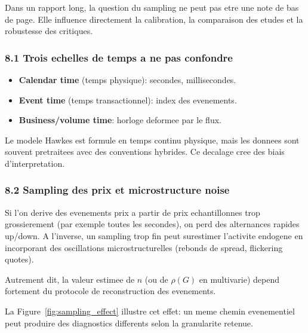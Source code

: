 \documentclass[11pt,a4paper]{article}
\begin{document}
Dans un rapport long, la question du sampling ne peut pas etre une note de bas de page. Elle influence directement la calibration, la comparaison des etudes et la robustesse des critiques.

\subsubsection*{8.1 Trois echelles de temps a ne pas confondre}
\begin{itemize}[leftmargin=1.2cm]
    \item \textbf{Calendar time} (temps physique): secondes, millisecondes.
    \item \textbf{Event time} (temps transactionnel): index des evenements.
    \item \textbf{Business/volume time}: horloge deformee par le flux.
\end{itemize}

Le modele Hawkes est formule en temps continu physique, mais les donnees sont souvent pretraitees avec des conventions hybrides. Ce decalage cree des biais d'interpretation.

\subsubsection*{8.2 Sampling des prix et microstructure noise}
Si l'on derive des evenements prix a partir de prix echantillonnes trop grossierement (par exemple toutes les secondes), on perd des alternances rapides up/down. A l'inverse, un sampling trop fin peut surestimer l'activite endogene en incorporant des oscillations microstructurelles (rebonds de spread, flickering quotes).

Autrement dit, la valeur estimee de $n$ (ou de $\rho(G)$ en multivarie) depend fortement du protocole de reconstruction des evenements.

La Figure~\ref{fig:sampling_effect} illustre cet effet: un meme chemin evenementiel peut produire des diagnostics differents selon la granularite retenue.
\end{document}
